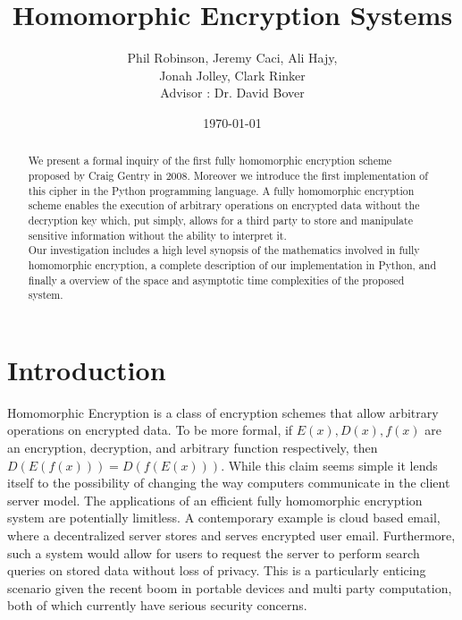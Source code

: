 \documentclass[letterpaper,11pt]{article} %
\title{Homomorphic Encryption Systems}
\date{\today}
\author{
Phil Robinson, Jeremy Caci, Ali Hajy,\\
Jonah Jolley, Clark Rinker\\
Advisor : Dr. David Bover}
\begin{document}
\maketitle

\begin{abstract}
\hspace{1em}We present a formal inquiry of the first fully homomorphic encryption scheme proposed by Craig Gentry in 2008. Moreover we introduce the first implementation of this cipher in the Python programming language. A fully homomorphic encryption scheme enables the execution of arbitrary operations on encrypted data without the decryption key which, put simply, allows for a third party to  store and manipulate sensitive information without the ability to interpret it.\\ 

\hspace{1em}Our investigation includes a high level synopsis of the mathematics involved in fully homomorphic encryption, a complete description of our implementation in Python, and finally a overview of the space and asymptotic time complexities of the proposed system. 
\end{abstract}


\section*{Introduction}

	Homomorphic Encryption is a class of encryption schemes that allow arbitrary operations on encrypted data. To be more formal, if $E(x),D(x),f(x)$ are an encryption, decryption, and arbitrary function respectively, then $D(E(f(x)))=D(f(E(x)))$. While this claim seems simple it lends itself to the possibility of changing the way computers communicate in the client server model. The applications of an efficient fully homomorphic encryption system are potentially limitless. A contemporary example is cloud based email, where a decentralized server stores and serves encrypted user email. Furthermore, such a system would allow for users to request the server to perform search queries on stored data without loss of privacy. This is a particularly enticing scenario given the recent boom in portable devices and multi party computation, both of which currently have serious security concerns. \\
\end{document}
